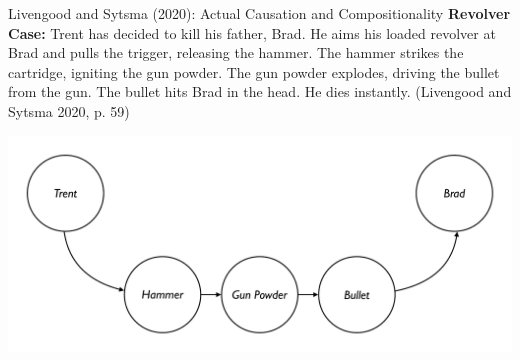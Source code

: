 \documentclass[xcolor=table,9pt,aspectratio=169]{beamer}
\begin{document}
\begin{frame}{\vspace*{10mm}Livengood and Sytsma (2020): Actual Causation and Compositionality}
\vspace*{-5mm}
\textbf{Revolver Case:} Trent has decided to kill his father, Brad.  He aims his loaded revolver at Brad and pulls the trigger, releasing the hammer. The hammer strikes the cartridge, igniting the gun powder. The gun powder explodes, driving the bullet from the gun. The bullet hits Brad in the head. He dies instantly. (Livengood and Sytsma 2020, p. 59)
\begin{center}
   \includegraphics[width=0.75\linewidth]{figures/revolver.pdf}
\end{center}
\end{frame}
\end{document}
